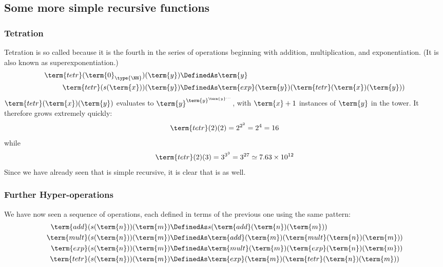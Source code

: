 
\subsection{Some more simple recursive functions}

\subsubsection{Tetration}

Tetration is so called because it is the fourth in the series of operations beginning with addition, multiplication, and exponentiation.  (It is also known as superexponentiation.)
%
\begin{align*}
\term{tetr}(\term{0}_{\type{\NN}})(\term{y}) &\DefinedAs \term{y}
\\
\term{tetr}(s(\term{x}))(\term{y}) &\DefinedAs \term{exp}(\term{y})(\term{tetr}(\term{x})(\term{y}))
\end{align*} 
$\term{tetr}(\term{x})(\term{y})$ evaluates to $\term{y}^{\term{y}^{\term{y}^{\ldots}}}$, with $\term{x}+1$ instances of $\term{y}$ in the tower.
It therefore grows extremely quickly: 
\[
\term{tetr}(2)(2) = 2^{2^{2}} = 2^4 = 16
\]
while 
\[
\term{tetr}(2)(3) = {3^{3^{3}}} = {3^{27}} \simeq 7.63 \times 10^{12}
\]
Since we have already seen that  is simple recursive, it is clear that  is as well.


\subsubsection{Further Hyper-operations}

We have now seen a sequence of operations, each defined in terms of the previous one using the same pattern:
\begin{align*}
\term{add}(s(\term{n}))(\term{m}) &\DefinedAs
s(\term{add}(\term{n})(\term{m}))
\\
\term{mult}(s(\term{n}))(\term{m}) &\DefinedAs
\term{add}(\term{m})(\term{mult}(\term{n})(\term{m}))
\\
\term{exp}(s(\term{n}))(\term{m}) &\DefinedAs
\term{mult}(\term{m})(\term{exp}(\term{n})(\term{m}))
\\
\term{tetr}(s(\term{n}))(\term{m}) &\DefinedAs \term{exp}(\term{m})(\term{tetr}(\term{n})(\term{m}))
\end{align*}

